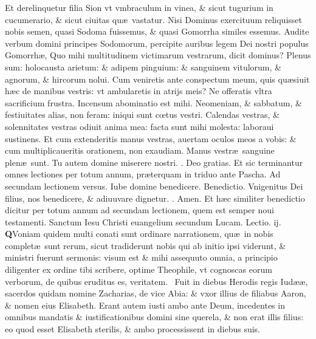 \documentclass[a5paper,10pt]{book}
\makeatletter
\def\leftmarginnote{%
	\lrmarginnote{\hskip -\marginparsep \hskip -6.5em}}
\DeclareRobustCommand{\Rbar}{\vers@resp{0pt}{R}}
\newcommand{\vers@resp@sym}{\raisebox{0.2ex}{\rotatebox[origin=c]{-20}{$\m@th\rceil$}}}
\newcommand{\vers@resp}[2]{%
  {\ooalign{\hidewidth\kern#1\vers@resp@sym\hidewidth\cr#2\cr}}%
}%
\def\ae{æ}
\def\oe{œ}
\makeatother
\begin{document}
\begin{multicols*}{2}
Et derelinquetur filia Sion vt vmbraculum in vinea, \& sicut tugurium in cucumerario, \& sicut ciuitas qu\ae \ vastatur.
Nisi Dominus exercituum reliquisset nobis semen, quasi Sodoma fuissemus, \& quasi Gomorrha similes essemus.
Audite verbum domini principes Sodomorum, percipite auribus legem Dei nostri populus Gomorrh\ae , Quo mihi multitudinem victimarum vestrarum, dicit dominus?
Plenus sum: holocausta arietum: \& adipem pinguium: \& sanguinem vitulorum, \& agnorum, \& hircorum nolui.
Cum veniretis ante conspectum meum, quis qu\ae siuit h\ae c de manibus vestris: vt ambularetis in atrijs meis?
Ne offeratis vltra sacrificium frustra.
Incensum abominatio est mihi.
Neomeniam, \& sabbatum, \& festiuitates alias, non feram: iniqui sunt c\oe tus vestri.
Calendas vestras, \& solennitates vestras odiuit anima mea: facta sunt mihi molesta: laboraui sustinens.
Et cum extenderitis manus vestras, auertam oculos meos a vobis: \& cum multiplicaueritis orationem, non exaudiam.
Manus vestr\ae \ sanguine plen\ae \ sunt.%
\newline Tu autem domine miserere nostri. \color{red} \Rbar . \color{black} Deo gratias.
\color{red} Et sic terminantur omnes lectiones per totum annum, pr\ae terquam in triduo ante Pascha. Ad secundam lectionem versus. \color{black} Iube domine benedicere. \color{red} Benedictio. \color{black} Vnigenitus Dei filius, nos benedicere, \& adiuuvare dignetur. \color{red} \Rbar . \color{black} Amen.
\newline \color{red} Et h\ae c similiter benedictio dicitur per totum annum ad secundam lectionem, quem est semper noui testamenti. Sanctum Iesu Christi euangelium secundum Lucam. Lectio. ij. \color{black}
\vspace{-2em}
\lettrine[lines=2]{\bfseries \color{red} Q}{}Voniam quidem multi conati sunt ordinare narrationem, qu\ae \ in nobis complet\ae \ sunt rerum, sicut tradiderunt nobis qui ab initio ipsi viderunt, \& ministri fuerunt sermonis: visum est \& mihi assequuto omnia, a principio diligenter ex ordine tibi scribere, optime Theophile, vt cognoscas eorum verborum, de quibus eruditus es, veritatem. \textdagger \ 
Fuit\leftmarginnote{\begin{flushright}ca. 1.\\A\end{flushright}} in diebus Herodis regis Iud\ae \ae , sacerdos quidam nomine Zacharias, de vice Abia: \& vxor illius de filiabus Aaron, \& nomen eius Elisabeth.
Erant autem iusti ambo ante Deum, incedentes in omnibus mandatis \& iustificationibus domini sine querela, \& non erat illis filius: eo quod esset Elisabeth sterilis, \& ambo processissent in diebus suis.

\end{multicols*}
\end{document}
